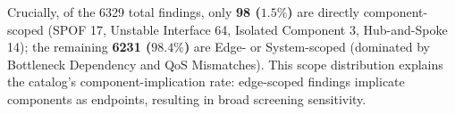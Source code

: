 Crucially, of the 6329 total findings, only \textbf{98 ($1.5\%$)} are directly component-scoped (SPOF 17, Unstable Interface 64, Isolated Component 3, Hub-and-Spoke 14); the remaining \textbf{6231 ($98.4\%$)} are Edge- or System-scoped (dominated by Bottleneck Dependency and QoS Mismatches). This scope distribution explains the catalog's component-implication rate: edge-scoped findings implicate components as endpoints, resulting in broad screening sensitivity.

